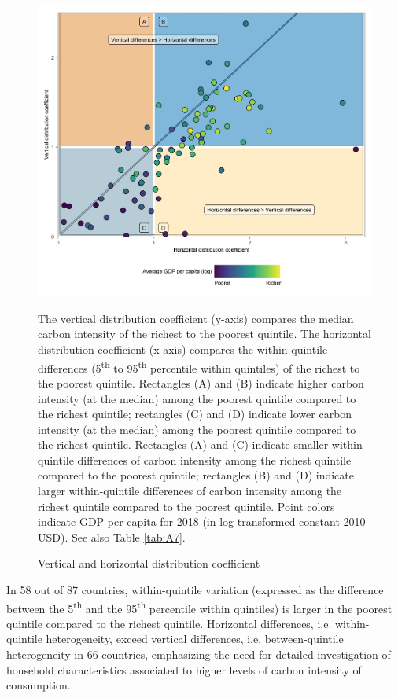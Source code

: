 \documentclass[12pt, a4paper]{article}
\newenvironment{subcaption2}
{\strut
\vspace{-5pt}
\begin{minipage}[b]{0.9\textwidth}
  \hspace*{-\parindent}
  \footnotesize}
 {\end{minipage}}
\begin{document}
\begin{figure}[ht!]
    \centering
    \includegraphics{Figure 2/Figure_2_2017}
    \caption{Vertical and horizontal distribution coefficient}
    \label{fig:fig_2}
    \begin{subcaption2}
    The vertical distribution coefficient (y-axis) compares the median carbon intensity of the richest to the poorest quintile. The horizontal distribution coefficient (x-axis) compares the within-quintile differences (5\textsuperscript{th} to 95\textsuperscript{th} percentile within quintiles) of the richest to the poorest quintile. Rectangles (A) and (B) indicate higher carbon intensity (at the median) among the poorest quintile compared to the richest quintile; rectangles (C) and (D) indicate lower carbon intensity (at the median) among the poorest quintile compared to the richest quintile. Rectangles (A) and (C) indicate smaller within-quintile differences of carbon intensity among the richest quintile compared to the poorest quintile; rectangles (B) and (D) indicate larger within-quintile differences of carbon intensity among the richest quintile compared to the poorest quintile. Point colors indicate GDP per capita for 2018 (in log-transformed constant 2010 USD). See also Table \ref{tab:A7}.
    \end{subcaption2}
\end{figure}

In 58 out of 87 countries, within-quintile variation (expressed as the difference between the 5\textsuperscript{th} and the 95\textsuperscript{th} percentile within quintiles) is larger in the poorest quintile compared to the richest quintile. Horizontal differences, i.e. within-quintile heterogeneity, exceed vertical differences, i.e. between-quintile heterogeneity in 66 countries, emphasizing the need for detailed investigation of household characteristics associated to higher levels of carbon intensity of consumption.
\end{document}
